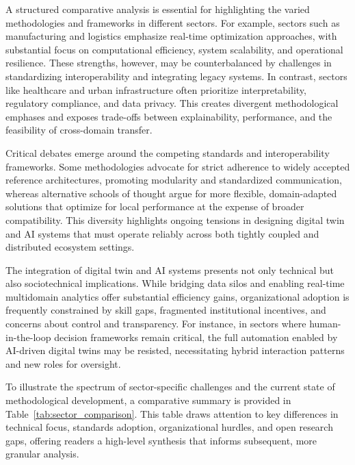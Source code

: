 \documentclass[sigconf]{acmart}
\begin{document}
A structured comparative analysis is essential for highlighting the varied methodologies and frameworks in different sectors. For example, sectors such as manufacturing and logistics emphasize real-time optimization approaches, with substantial focus on computational efficiency, system scalability, and operational resilience. These strengths, however, may be counterbalanced by challenges in standardizing interoperability and integrating legacy systems. In contrast, sectors like healthcare and urban infrastructure often prioritize interpretability, regulatory compliance, and data privacy. This creates divergent methodological emphases and exposes trade-offs between explainability, performance, and the feasibility of cross-domain transfer.

Critical debates emerge around the competing standards and interoperability frameworks. Some methodologies advocate for strict adherence to widely accepted reference architectures, promoting modularity and standardized communication, whereas alternative schools of thought argue for more flexible, domain-adapted solutions that optimize for local performance at the expense of broader compatibility. This diversity highlights ongoing tensions in designing digital twin and AI systems that must operate reliably across both tightly coupled and distributed ecosystem settings.

The integration of digital twin and AI systems presents not only technical but also sociotechnical implications. While bridging data silos and enabling real-time multidomain analytics offer substantial efficiency gains, organizational adoption is frequently constrained by skill gaps, fragmented institutional incentives, and concerns about control and transparency. For instance, in sectors where human-in-the-loop decision frameworks remain critical, the full automation enabled by AI-driven digital twins may be resisted, necessitating hybrid interaction patterns and new roles for oversight.

To illustrate the spectrum of sector-specific challenges and the current state of methodological development, a comparative summary is provided in Table~\ref{tab:sector_comparison}. This table draws attention to key differences in technical focus, standards adoption, organizational hurdles, and open research gaps, offering readers a high-level synthesis that informs subsequent, more granular analysis.
\end{document}

